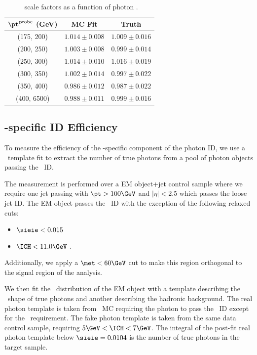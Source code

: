 \begin{table}[htbp]
  \begin{center}
    \begin{tabular}{ c|c|c }
      $\pt^{\mathrm{probe}}$ (GeV) & MC Fit & Truth \\\hline
      (175, 200)  & $1.014 \pm 0.008$ & $1.009 \pm 0.016$ \\
      (200, 250)  & $1.003 \pm 0.008$ & $0.999 \pm 0.014$ \\
      (250, 300)  & $1.014 \pm 0.010$ & $1.016 \pm 0.019$ \\
      (300, 350)  & $1.002 \pm 0.014$ & $0.997 \pm 0.022$ \\
      (350, 400)  & $0.986 \pm 0.012$ & $0.987 \pm 0.022$ \\
      (400, 6500)  & $0.988 \pm 0.011$ & $0.999 \pm 0.016$ \\
    \end{tabular}
    \caption{\egamma\ scale factors as a function of photon \pt.}
    \label{tab:idsf_results}
  \end{center}
\end{table}

\subsection{\Pgg-specific ID Efficiency}
\label{sec:pvsf}

To measure the efficiency of the \Pgg-specific component of the photon ID, we use a \sieie\ template fit to extract the number of true photons from a pool of photon objects passing the \egamma\ ID.

The measurement is performed over a EM object+jet control sample where we require one jet passing with $\pt > 100\GeV$ and $|\eta| < 2.5$ which passes the loose jet ID. 
The EM object passes the \egamma\ ID with the execption of the following relaxed cuts: 
\begin{itemize}
\item $\sieie < 0.015$
\item $\ICH < 11.0\GeV$ .
\end{itemize}
Additionally, we apply a $\met < 60\GeV$ cut to make this region orthogonal to the signal region of the analysis.

We then fit the \sieie\ distribution of the EM object with a template describing the \sieie\ shape of true photons and another describing the hadronic background. 
The real photon template is taken from \gj\ MC requiring the photon to pass the \egamma\ ID except for the \sieie\ requirement.
The fake photon template is taken from the same data control sample, requiring $5\GeV < \ICH
< 7\GeV$. 
The integral of the post-fit real photon template below $\sieie = 0.0104$ is the number of true photons in the target sample.

